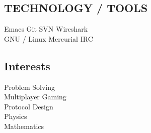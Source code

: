 \documentclass[letterpaper]{deedy-resume} %
\begin{document}
\begin{minipage}[t]{0.33\textwidth}
\subsection{TECHNOLOGY / TOOLS}
Emacs \textbullet{} Git \textbullet{} SVN  \textbullet{} Wireshark \\
GNU / Linux \textbullet{} Mercurial \textbullet{}
IRC \textbullet{}  
\sectionspace %
\subsection{Interests}
Problem Solving \\
Multiplayer Gaming \\
Protocol Design \\
Physics \\
Mathematics \\
\sectionspace %

\end{minipage} %
\hfill
%
%
\end{document}

